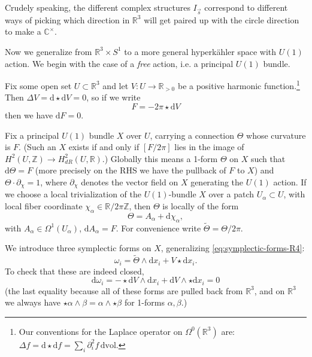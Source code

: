 \documentclass[12pt,letterpaper,reqno]{article}
\numberwithin{equation}{section}
\newcommand{\R}{\ensuremath{\mathbb R}}
\newcommand{\C}{\ensuremath{\mathbb C}}
\newcommand{\Z}{\ensuremath{\mathbb Z}}
\newcommand{\hk}{hyperk\"ahler\xspace}
\newcommand{\de}{\mathrm{d}}
\newcommand{\vol}{\mathrm{vol}}
\newcommand{\ti}[1]{\textit{#1}}
\begin{document}
Crudely speaking, the different complex structures 
$I_{\vec s}$ correspond to different ways of picking which 
direction in $\R^3$ will get 
paired up with the circle direction to make a $\C^\times$.

\begin{example} \label{exa:incomplete-gibbons-hawking}
Now we generalize from $\R^3 \times S^1$ to a more general
\hk space with $U(1)$ action. We begin with the case of 
a \ti{free} action, i.e. a principal
$U(1)$ bundle.

Fix some open set $U \subset \R^3$ and
let $V: U \to \R_{>0}$ be a positive harmonic function.\footnote{Our
conventions for the Laplace operator on $\Omega^0(\R^3)$ are:
$\Delta f = \de \star \de f = \sum_i \partial_i^2 f \, \de \vol$.}
Then $\Delta V = \de \star \de V = 0$, so if we write
\begin{equation}
  F = -2 \pi \star \de V
\end{equation}
then we have $\de F = 0$. 

Fix a principal $U(1)$ bundle $X$ over $U$, carrying a connection
$\Theta$ whose curvature is $F$.
(Such an $X$ exists if and only if $[F/2\pi]$ lies in 
the image of $H^2(U,\Z) \to H^2_{dR}(U,\R)$.) 
Globally this means a 1-form $\Theta$ on $X$
such that $\de \Theta = F$ (more precisely on the RHS we have
the pullback of $F$ to $X$) and $\Theta \cdot \partial_\chi = 1$,
where $\partial_\chi$ denotes the vector field on $X$ 
generating the $U(1)$ action. If we choose a local
trivialization of the $U(1)$-bundle $X$ over a patch
$U_\alpha \subset U$, with local 
fiber coordinate $\chi_{\alpha} \in \R / 2 \pi \Z$, then $\Theta$ 
is locally of the form
\begin{equation}
 \Theta = A_\alpha + \de \chi_{\alpha},
\end{equation}
with $A_\alpha \in \Omega^1(U_\alpha)$, $\de A_\alpha = F$.
\newcommand{\tTheta}{\tilde\Theta}
For convenience write $\tTheta = \Theta / 2\pi$.

We introduce three symplectic forms on $X$,
generalizing \eqref{eq:symplectic-forms-R4}:
\begin{equation}
  \omega_i = \tTheta \wedge \de x_i + V \star \de x_i.
\end{equation}
To check that these are indeed closed,
\begin{equation}
  \de \omega_i = - \star \de V \wedge \de x_i + \de V \wedge \star \de x_i = 0
\end{equation}
(the last equality because all of these forms are pulled back
from $\R^3$, and on $\R^3$ we always have $\star \alpha \wedge \beta = \alpha \wedge \star \beta$ for 1-forms $\alpha, \beta$.)


\end{example}
\end{document}
